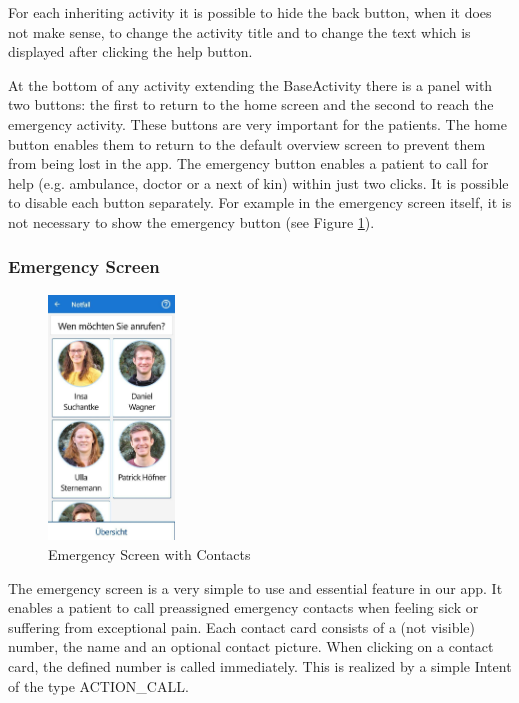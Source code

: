 For each inheriting activity it is possible to hide the back button, when it does not make sense, to change the activity title
    and to change the text which is displayed after clicking the help button.
    
At the bottom of any activity extending the BaseActivity there is a panel with two buttons: the first to return to the home screen and the second to reach the emergency activity. These buttons are very important for the patients. The home button enables them to return to the default overview screen to prevent them from being lost in the app. The emergency button enables a patient to call for help (e.g. ambulance, doctor or a next of kin) within just two clicks. 
It is possible to disable each button separately. For example in the emergency screen itself, it is not necessary to show the emergency button (see Figure \ref{fig:emergency}).

\subsubsection{Emergency Screen}
\begin{figure}
\vspace{-30pt}
\begin{center}
    \includegraphics[width=0.30\textwidth]{figures/KlausEmergency.jpg}
  \end{center}
  \caption{Emergency Screen with Contacts}
  \label{fig:emergency}
  \vspace{-30pt}
\end{figure}
The emergency screen is a very simple to use and essential feature in our app. It enables a patient to call preassigned emergency contacts when feeling sick or suffering from exceptional pain. Each contact card consists of a (not visible) number, the name and an optional contact picture. When clicking on a contact card, the defined number is called immediately. This is realized by a simple Intent of the type ACTION\_CALL.

